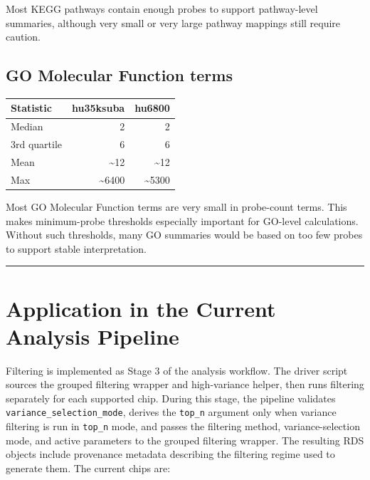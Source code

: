 \documentclass[
  letterpaper,
  DIV=11,
  numbers=noendperiod,
  openany,
  oneside]{scrreprt}
\begin{document}
Most KEGG pathways contain enough probes to support pathway-level
summaries, although very small or very large pathway mappings still
require caution.

\subsection{GO Molecular Function
terms}\label{go-molecular-function-terms}

\begin{longtable}[]{@{}lrr@{}}
\toprule\noalign{}
Statistic & hu35ksuba & hu6800 \\
\midrule\noalign{}
\endhead
\bottomrule\noalign{}
\endlastfoot
Median & 2 & 2 \\
3rd quartile & 6 & 6 \\
Mean & \textasciitilde12 & \textasciitilde12 \\
Max & \textasciitilde6400 & \textasciitilde5300 \\
\end{longtable}

Most GO Molecular Function terms are very small in probe-count terms.
This makes minimum-probe thresholds especially important for GO-level
calculations. Without such thresholds, many GO summaries would be based
on too few probes to support stable interpretation.

\begin{center}\rule{0.5\linewidth}{0.5pt}\end{center}

\section{Application in the Current Analysis
Pipeline}\label{application-in-the-current-analysis-pipeline}

Filtering is implemented as Stage 3 of the analysis workflow. The driver
script sources the grouped filtering wrapper and high-variance helper,
then runs filtering separately for each supported chip. During this
stage, the pipeline validates \texttt{variance\_selection\_mode},
derives the \texttt{top\_n} argument only when variance filtering is run
in \texttt{top\_n} mode, and passes the filtering method,
variance-selection mode, and active parameters to the grouped filtering
wrapper. The resulting RDS objects include provenance metadata
describing the filtering regime used to generate them. The current chips
are:
\end{document}
